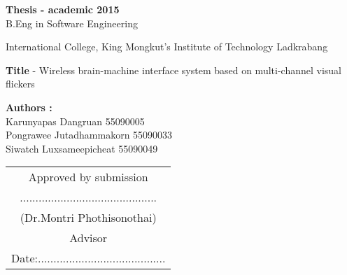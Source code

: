 \begin{approve}
\textbf{Thesis - academic 2015}\\
B.Eng in Software Engineering

International College, King Mongkut's Institute of Technology Ladkrabang


\textbf{Title} - Wireless brain-machine interface system based on multi-channel visual flickers

\textbf{Authors :}\\
Karunyapas  Dangruan  55090005\\
Pongrawee  Jutadhammakorn 55090033\\
Siwatch  Luxsameepicheat  55090049\\

\begin{flushright}
\begin{tabu}{c}
	
	Approved by submission\\
	............................................\\
	(Dr.Montri Phothisonothai)\\
	Advisor\\
	
	Date:.........................................\\
\end{tabu}   
\end{flushright}




\end{approve}